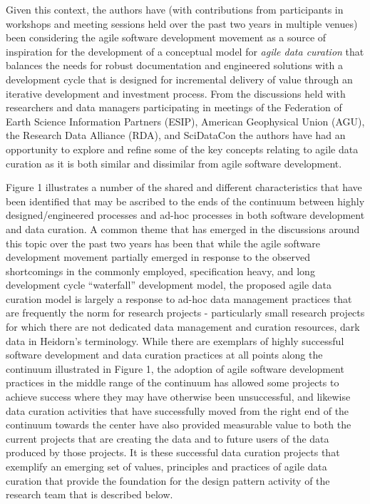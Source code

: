 \documentclass[paper]{ijdc-v9}
\begin{document}
Given this context, the authors have (with contributions from
participants in workshops and meeting sessions held over the past two
years in multiple venues) been considering the agile software
development movement \autocite{beck_manifesto_2001} as a source of
inspiration for the development of a conceptual model for \emph{agile
data curation} that balances the needs for robust documentation and
engineered solutions with a development cycle that is designed for
incremental delivery of value through an iterative development and
investment process. From the discussions held with researchers and data
managers participating in meetings of the Federation of Earth Science
Information Partners (ESIP), American Geophysical Union (AGU), the
Research Data Alliance (RDA), and SciDataCon the authors have had an
opportunity to explore and refine some of the key concepts relating to
agile data curation as it is both similar and dissimilar from agile
software development.

Figure 1 illustrates a number of the shared and different
characteristics that have been identified that may be ascribed to the
ends of the continuum between highly designed/engineered processes and
ad-hoc processes in both software development and data curation. A
common theme that has emerged in the discussions around this topic over
the past two years has been that while the agile software development
movement partially emerged in response to the observed shortcomings in
the commonly employed, specification heavy, and long development cycle
``waterfall'' development model, the proposed agile data curation model
is largely a response to ad-hoc data management practices that are
frequently the norm for research projects - particularly small research
projects for which there are not dedicated data management and curation
resources, dark data in Heidorn's \autocite*{heidorn_shedding_2008}
terminology. While there are exemplars of highly successful software
development and data curation practices at all points along the
continuum illustrated in Figure 1, the adoption of agile software
development practices in the middle range of the continuum has allowed
some projects to achieve success where they may have otherwise been
unsuccessful, and likewise data curation activities that have
successfully moved from the right end of the continuum towards the
center have also provided measurable value to both the current projects
that are creating the data and to future users of the data produced by
those projects. It is these successful data curation projects that
exemplify an emerging set of values, principles and practices of agile
data curation that provide the foundation for the design pattern
activity of the research team that is described below.
\end{document}
